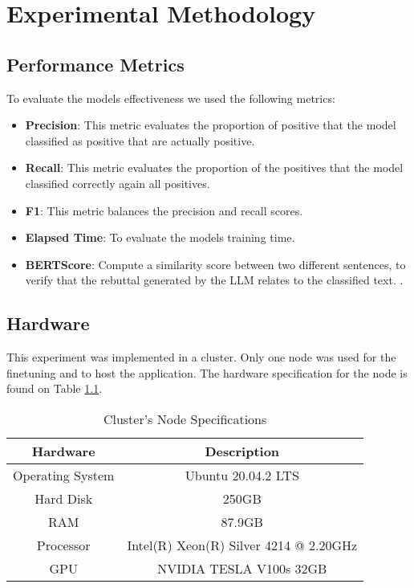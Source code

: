 
\chapter{Experimental Methodology}  

\section{Performance Metrics}
To evaluate the models effectiveness we used the following metrics:

\begin{itemize}
	\item{\textbf{Precision}}: This metric evaluates the proportion of positive that the model classified as positive that are actually positive.
	\item{\textbf{Recall}}: This metric evaluates the proportion of the positives that the model classified correctly again all positives.
	\item{\textbf{F1}}: This metric balances the precision and recall scores.
	\item{\textbf{Elapsed Time}}: To evaluate the models training time.
	\item{\textbf{BERTScore}}: Compute a similarity score between two different sentences, to verify that the rebuttal generated by the LLM relates to the classified text. \cite{zhang2020bertscoreevaluatingtextgeneration}.
	
\end{itemize}


\section{Hardware}
This experiment was implemented in a cluster. Only one node was used for the finetuning and to host the application. The hardware specification
for the node is found on Table \ref{table:hardware}.

\begin{table}[ht!]
\centering
\caption{Cluster's Node Specifications}
\begin{tabular}{||c | c||} 
 \hline
\textbf{Hardware} & \textbf{Description} \\ [0.5ex] 
 \hline
 Operating System & Ubuntu 20.04.2 LTS \\ [0.5ex] 
 \hline
 Hard Disk & 250GB  \\ [0.5ex] 
 \hline
 RAM & 87.9GB  \\ [0.5ex] 
 \hline
 Processor & Intel(R) Xeon(R) Silver 4214 @ 2.20GHz \\ [0.5ex] 
 \hline
 GPU & NVIDIA TESLA V100s 32GB \\ [0.5ex] 
 \hline
\end{tabular}
\label{table:hardware}
\end{table}



